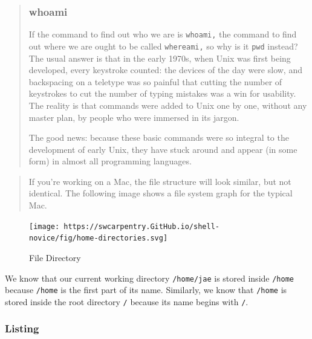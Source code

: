 \documentclass[
  letterpaper,
  DIV=11,
  numbers=noendperiod]{scrreprt}
\begin{document}
\begin{quote}
\hypertarget{whoami}{%
\subsubsection*{whoami}\label{whoami}}

If the command to find out who we are is \texttt{whoami,} the command to
find out where we are ought to be called \texttt{whereami,} so why is it
\texttt{pwd} instead? The usual answer is that in the early 1970s, when
Unix was first being developed, every keystroke counted: the devices of
the day were slow, and backspacing on a teletype was so painful that
cutting the number of keystrokes to cut the number of typing mistakes
was a win for usability. The reality is that commands were added to Unix
one by one, without any master plan, by people who were immersed in its
jargon.

The good news: because these basic commands were so integral to the
development of early Unix, they have stuck around and appear (in some
form) in almost all programming languages.
\end{quote}

\begin{quote}
If you're working on a Mac, the file structure will look similar, but
not identical. The following image shows a file system graph for the
typical Mac.
\end{quote}

\begin{figure}

{\centering \texttt{[image: https://swcarpentry.GitHub.io/shell-novice/fig/home-directories.svg]}

}

\caption{File Directory}

\end{figure}

We know that our current working directory \texttt{/home/jae} is stored
inside \texttt{/home} because \texttt{/home} is the first part of its
name. Similarly, we know that \texttt{/home} is stored inside the root
directory \texttt{/} because its name begins with \texttt{/}.

\hypertarget{listing}{%
\subsubsection*{Listing}\label{listing}}
\end{document}
